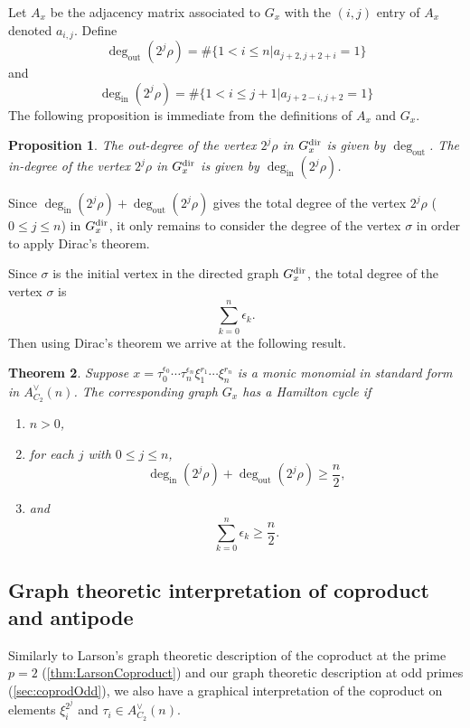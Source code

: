 \documentclass{amsart}
\newtheorem{theorem}{Theorem}[section]
\newtheorem{proposition}[theorem]{Proposition}
\theoremstyle{definition}
\theoremstyle{plain}
\numberwithin{theorem}{section}
\numberwithin{equation}{section}
\numberwithin{figure}{section}
\DeclareMathOperator{\out}{out}
\DeclareMathOperator{\inn}{in}
\newcommand{\0}{\langle 0 \rangle }
\begin{document}
Let $A_x$ be the adjacency matrix associated to $G_x$ with the $(i,j)$ entry of $A_x$ denoted $a_{i,j}$.
Define
    \[
    \deg_{\out} (2^j \rho) = \#\{1 < i \leq n | a_{j + 2, j + 2 + i} = 1\}
    \]
    and 
    \[
    \deg_{\inn} (2^j\rho) = \#\{1 < i \leq j+1 | a_{j + 2 -i, j + 2} = 1\}
    \] 
The following proposition is immediate from the definitions of $A_x$ and $G_x$.

\begin{proposition}  
    The out-degree of the vertex $2^j \rho$ in $G_x^\textup{dir}$ is given by $\deg_{\out}$. The in-degree of the vertex $2^j \rho$ in $G_x^\textup{dir}$ is given by $\deg_{\inn} (2^j\rho)$.
\end{proposition}

Since $\deg_{\inn}(2^j\rho) + \deg_{\out}(2^j\rho)$ gives the total degree of the vertex $2^j \rho$ ($0 \leq j \leq n$) in $G_x^\textup{dir}$, it only remains to consider the degree of the vertex $\sigma$ in order to apply Dirac's theorem. 

Since $\sigma$ is the initial vertex in the directed graph $G_x^\textup{dir}$, the total degree of the vertex $\sigma$ is 
\[
\sum_{k = 0}^n \epsilon_k.
\]
Then using Dirac's theorem we arrive at the following result.
\begin{theorem} \label{thm:HamiltonCycleC2}
    Suppose $x = \tau_0^{\epsilon_0} \cdots \tau_n^{\epsilon_n} \xi_1^{r_1} \cdots \xi_n^{r_n}$ is a monic monomial { in standard form} in $ A_{C_2}^\vee(n)$. The corresponding graph $G_x$ has a Hamilton cycle if
    \begin{enumerate}
        \item $n>0$,
        \item for each $j$ with $0 \leq j \leq n$,
        \[
            \deg_{\inn}(2^j \rho) + \deg_{\out} (2^j \rho) \geq         \frac{n}{2}, 
        \]
        \item and \[\sum_{k=0}^n  \epsilon_k \geq \frac{n}{2}.\]
    \end{enumerate}  
\end{theorem}

\subsection{Graph theoretic interpretation of coproduct and antipode}

Similarly to Larson's graph theoretic description of the coproduct at the prime $p =2$ (\cref{thm:LarsonCoproduct}) and our graph theoretic description at odd primes (\cref{sec:coprodOdd}), we also have a graphical interpretation of the coproduct on elements $\xi_i^{2^j}$ and $\tau_i \in A_{C_2}^\vee (n)$. 
\end{document}
